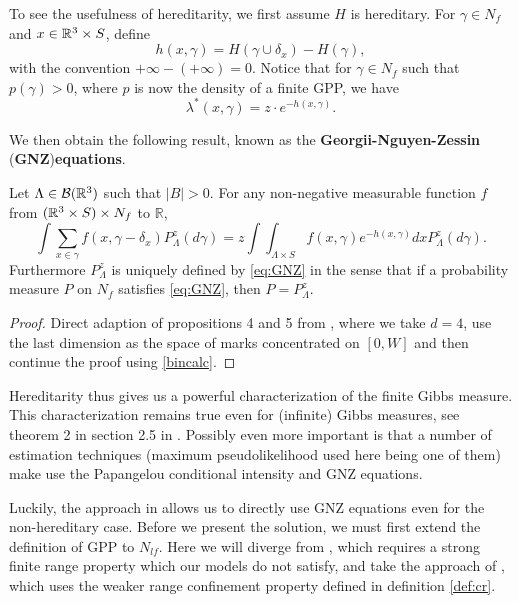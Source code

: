 To see the usefulness of hereditarity, we first assume $H$ is hereditary. For $\gamma \in N_f$ and $x \in {\mathbb R^3}\times S$, define
$$h(x,\gamma) = H(\gamma \cup \delta_x) - H(\gamma),$$
with the convention $+\infty - (+\infty) = 0$. Notice that for $\gamma \in N_f$ such that $p(\gamma) > 0$, where $p$ is now the density of a finite GPP, we have
$$\lambda^*(x,\gamma) = z \cdot e^{-h(x,\gamma)}.$$

We then obtain the following result, known as the \textbf{Georgii-Nguyen-Zessin }(\textbf{GNZ})\textbf{equations}. 

\begin{proposition} Let $\Lambda \in \mathcal B({\mathbb R^3})$ such that $|B|>0$. For any non-negative measurable function $f$ from $({\mathbb R^3}\times S)\times N_f$ to $\mathbb R$,
	\begin{equation}\label{eq:GNZ}\int \sum_{x \in \gamma} f(x,\gamma- \delta_x) P^z_\Lambda (d\gamma) = z \int \int_{\Lambda\times S} f(x,\gamma) e^{-h(x,\gamma)} dx P^z_\Lambda (d\gamma).\end{equation}
	Furthermore $P^z_\Lambda$ is uniquely defined by \ref{eq:GNZ} in the sense that if a probability measure $P$ on $N_f$ satisfies \ref{eq:GNZ}, then $P=P^z_\Lambda$.
\end{proposition}
\begin{proof}
	Direct adaption of propositions 4 and 5 from \cite{Dereudre2017}, where we take $d=4$, use the last dimension as the space of marks concentrated on $[0,W]$ and then continue the proof using \ref{bincalc}. 
\end{proof}

Hereditarity thus gives us a powerful characterization of the finite Gibbs measure. This characterization remains true even for (infinite) Gibbs measures, see theorem 2 in section 2.5 in \cite{Dereudre2017}. Possibly even more important is that a number of estimation techniques (maximum pseudolikelihood used here being one of them) make use the Papangelou conditional intensity and GNZ equations.
 
Luckily, the approach in  \cite{DereudreLavancier2007} allows us to directly use GNZ equations even for the non-hereditary case. Before we present the solution, we must first extend the definition of GPP to $N_{lf}$. Here we will diverge from \cite{Dereudre2017}, which requires a strong finite range property which our models do not satisfy, and take the approach of \cite{DDG12}, which uses the weaker range confinement property defined in definition \ref{def:cr}. 

